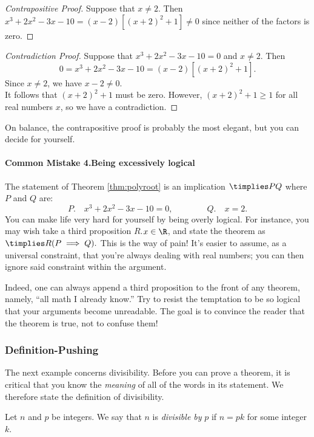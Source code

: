 \begin{proof}[Contrapositive Proof]
Suppose that $x\neq 2$. Then $x^3+2x^2-3x-10=(x-2)[(x+2)^2+1]\neq 0$ since neither of the factors is zero.
\end{proof}

\begin{proof}[Contradiction Proof]
Suppose that $x^3+2x^2-3x-10=0$ and $x\neq 2$. Then
\[0=x^3+2x^2-3x-10=(x-2)[(x+2)^2+1].\]
Since $x\neq 2$, we have $x-2\neq 0$.\\
It follows that $(x+2)^2+1$ must be zero. However, $(x+2)^2+1\ge 1$ for all real numbers $x$, so we have a contradiction.
\end{proof}

\noindent On balance, the contrapositive proof is probably the most elegant, but you can decide for yourself.


\paragraph{Common Mistake 4.\quad Being excessively logical}

The statement of Theorem \ref{thm:polyroot} is an implication $\timplies PQ$ where $P$ and $Q$ are:
\[P.\quad x^3+2x^2-3x-10=0, \qquad\qquad Q.\quad x=2.\]
You can make life very hard for yourself by being overly logical. For instance, you may wish take a third proposition $R$.\quad $x\in\R$, and state the theorem as $\timplies R{(P\implies Q).}$ This is the way of pain! It's easier to assume, as a universal constraint, that you're always dealing with real numbers; you can then ignore said constraint within the argument.

\noindent Indeed, one can always append a third proposition to the front of any theorem, namely, ``all math I already know.'' Try to resist the temptation to be so logical that your arguments become unreadable. The goal is to convince the reader that the theorem is true, not to confuse them!

\subsubsection*{Definition-Pushing}

The next example concerns divisibility. Before you can prove a theorem, it is critical that you know the \emph{meaning} of all of the words in its statement. We therefore state the definition of divisibility.

\begin{defn}
Let $n$ and $p$ be integers. We say that $n$ is \emph{divisible by} $p$ if $n=pk$ for some integer $k$.
\end{defn}

